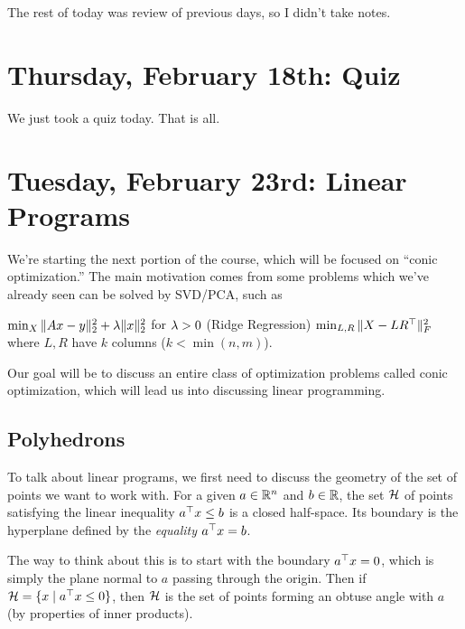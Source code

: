 \documentclass[11 pt]{scrartcl}
\begin{document}
The rest of today was review of previous days, so I didn't take notes.

\section{Thursday, February 18th: Quiz}
We just took a quiz today. 
That is all. 


\newpage
\section{Tuesday, February 23rd: Linear Programs}
We're starting the next portion of the course, which will be focused on ``conic optimization.'' 
The main motivation comes from some problems which we've already seen can be solved by SVD/PCA, such as 
\begin{itemize}
    \ii $\min_{X} \|Ax-y\|_2^2 + \lambda \|x\|_2^2$ for $\lambda > 0$ (Ridge Regression)
    \ii $\min_{L,R} \|X-LR^\top\|_F^2$ where $L, R$ have $k$ columns ($k < \min(n,m)$). 
\end{itemize}

Our goal will be to discuss an entire class of optimization problems called conic optimization, which will lead us into discussing linear programming.

\subsection{Polyhedrons}
To talk about linear programs, we first need to discuss the geometry of the set of points we want to work with. 
For a given $a\in \mathbb R^n$ and $b\in \mathbb R$, the set $\mathcal H$ of points satisfying the linear inequality $a^\top x \leq b$ is a closed half-space. 
Its boundary is the hyperplane defined by the \emph{equality} $a^\top x = b$. 

The way to think about this is to start with the boundary $a^\top x=0$, which is simply the plane normal to $a$ passing through the origin. 
Then if $\mathcal H = \{x\; |\; a^\top x \leq 0\}$, then $\mathcal H$ is the set of points forming an obtuse angle with $a$ (by properties of inner products). 
\end{document}
